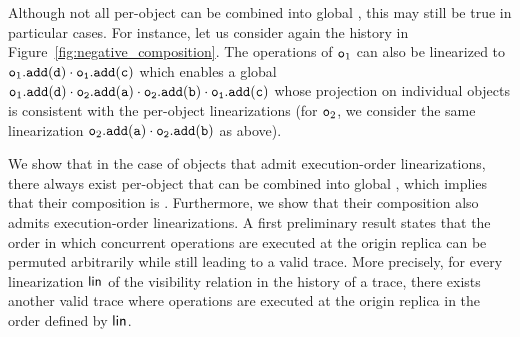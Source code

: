 Although not all per-object  can be combined into global , this may still be true in particular cases. For instance, let us consider again the history in Figure~\ref{fig:negative_composition}. The operations of $\mathtt{o}_1$ can also be linearized to $\aobj_1.\alabelshort[{\tt add}]{d}\cdot \aobj_1.\alabelshort[{\tt add}]{c}$ which enables a global \crdtlinearization{} $\aobj_1.\alabelshort[{\tt add}]{d}\cdot \aobj_2.\alabelshort[{\tt add}]{a}\cdot \aobj_2.\alabelshort[{\tt add}]{b}\cdot \aobj_1.\alabelshort[{\tt add}]{c}$ whose projection on individual objects is consistent with the per-object linearizations (for $\mathtt{o}_2$, we consider the same linearization $\aobj_2.\alabelshort[{\tt add}]{a}\cdot \aobj_2.\alabelshort[{\tt add}]{b}$ as above).

We show that in the case of \crdtlinearizable{} objects that admit execution-order linearizations, there always exist per-object  that can be combined into global , which implies that their composition is \crdtlinearizable{}. Furthermore, we show that their composition also admits execution-order linearizations. A first preliminary result states that the order in which concurrent operations are executed at the origin replica can be permuted arbitrarily while still leading to a valid trace. More precisely, for every linearization $\mathsf{lin}$ of the visibility relation in the history of a trace, there exists another valid trace where operations are executed at the origin replica in the order defined by $\mathsf{lin}$.

